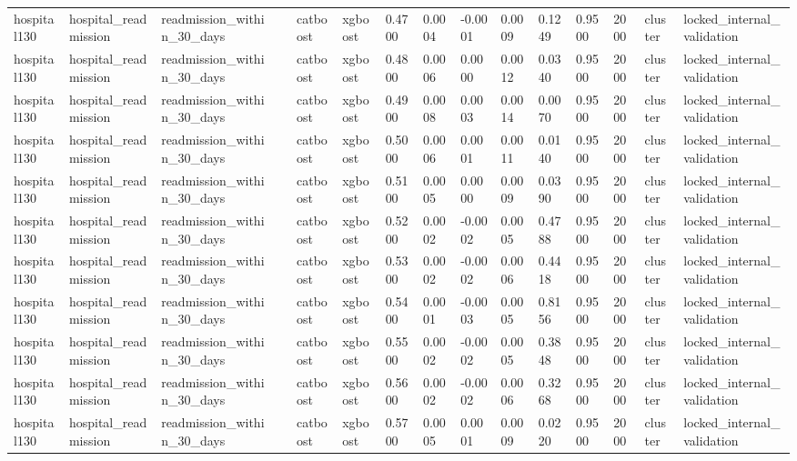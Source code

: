 \begin{tabular}{lllllllllllllll}
hospital130 & hospital\_readmission & readmission\_within\_30\_days &  & catboost & xgboost & 0.4700 & 0.0004 & -0.0001 & 0.0009 & 0.1249 & 0.9500 & 2000 & cluster & locked\_internal\_validation \\
hospital130 & hospital\_readmission & readmission\_within\_30\_days &  & catboost & xgboost & 0.4800 & 0.0006 & 0.0000 & 0.0012 & 0.0340 & 0.9500 & 2000 & cluster & locked\_internal\_validation \\
hospital130 & hospital\_readmission & readmission\_within\_30\_days &  & catboost & xgboost & 0.4900 & 0.0008 & 0.0003 & 0.0014 & 0.0070 & 0.9500 & 2000 & cluster & locked\_internal\_validation \\
hospital130 & hospital\_readmission & readmission\_within\_30\_days &  & catboost & xgboost & 0.5000 & 0.0006 & 0.0001 & 0.0011 & 0.0140 & 0.9500 & 2000 & cluster & locked\_internal\_validation \\
hospital130 & hospital\_readmission & readmission\_within\_30\_days &  & catboost & xgboost & 0.5100 & 0.0005 & 0.0000 & 0.0009 & 0.0390 & 0.9500 & 2000 & cluster & locked\_internal\_validation \\
hospital130 & hospital\_readmission & readmission\_within\_30\_days &  & catboost & xgboost & 0.5200 & 0.0002 & -0.0002 & 0.0005 & 0.4788 & 0.9500 & 2000 & cluster & locked\_internal\_validation \\
hospital130 & hospital\_readmission & readmission\_within\_30\_days &  & catboost & xgboost & 0.5300 & 0.0002 & -0.0002 & 0.0006 & 0.4418 & 0.9500 & 2000 & cluster & locked\_internal\_validation \\
hospital130 & hospital\_readmission & readmission\_within\_30\_days &  & catboost & xgboost & 0.5400 & 0.0001 & -0.0003 & 0.0005 & 0.8156 & 0.9500 & 2000 & cluster & locked\_internal\_validation \\
hospital130 & hospital\_readmission & readmission\_within\_30\_days &  & catboost & xgboost & 0.5500 & 0.0002 & -0.0002 & 0.0005 & 0.3848 & 0.9500 & 2000 & cluster & locked\_internal\_validation \\
hospital130 & hospital\_readmission & readmission\_within\_30\_days &  & catboost & xgboost & 0.5600 & 0.0002 & -0.0002 & 0.0006 & 0.3268 & 0.9500 & 2000 & cluster & locked\_internal\_validation \\
hospital130 & hospital\_readmission & readmission\_within\_30\_days &  & catboost & xgboost & 0.5700 & 0.0005 & 0.0001 & 0.0009 & 0.0220 & 0.9500 & 2000 & cluster & locked\_internal\_validation \\

\end{tabular}
